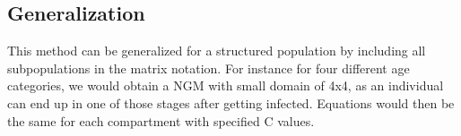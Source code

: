 \documentclass{article}
\begin{document}
\subsection*{Generalization}

This method can be generalized for a structured population by including all subpopulations in the matrix notation. For instance for four different age categories, we would obtain a NGM with small domain of 4x4, as an individual can end up in one of those stages after getting infected. Equations would then be the same for each compartment with specified C values. 
\end{document}
